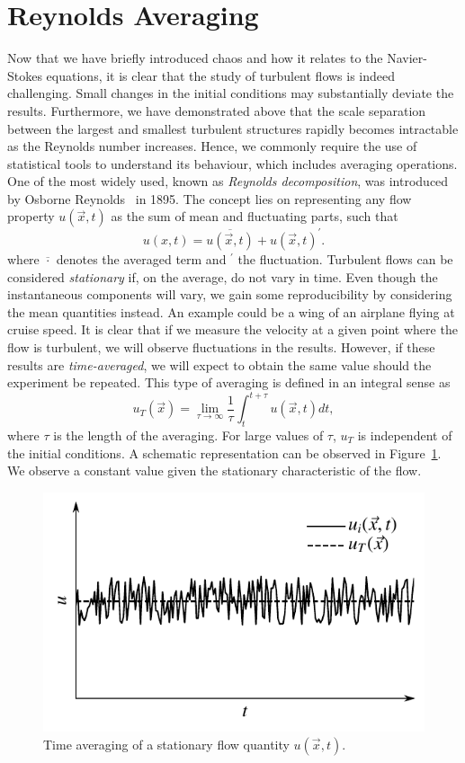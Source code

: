 \section{Reynolds Averaging}
Now that we have briefly introduced chaos and how it relates to the Navier-Stokes equations, it is clear that the study of turbulent flows is indeed challenging. Small changes in the initial conditions may substantially deviate the results. Furthermore, we have demonstrated above that the scale separation between the largest and smallest turbulent structures rapidly becomes intractable as the Reynolds number increases. Hence, we commonly require the use of statistical tools to understand its behaviour, which includes averaging operations. One of the most widely used, known as \textit{Reynolds decomposition}, was introduced by Osborne Reynolds~\cite{} in 1895. The concept lies on representing any flow property $u(\vec{x},t)$ as the sum of mean and fluctuating parts, such that
\begin{equation}
	u(x,t) = \overline{u(\vec{x},t)} + u(\vec{x},t)^\prime.
	\label{eq:reynolds_decomp}
\end{equation}
where $\overline{\cdot}$ denotes the averaged term and $^\prime$ the fluctuation.
Turbulent flows can be considered \textit{stationary} if, on the average, do not vary in time. Even though the instantaneous components will vary, we gain some reproducibility by considering the mean quantities instead. An example could be a wing of an airplane flying at cruise speed. It is clear that if we measure the velocity at a given point where the flow is turbulent, we will observe fluctuations in the results. However, if these results are \textit{time-averaged}, we will expect to obtain the same value should the experiment be repeated. This type of averaging is defined in an integral sense as
\begin{equation}
	u_T(\vec{x}) = \lim_{\tau\rightarrow\infty} \frac{1}{\tau} \int_t^{t+\tau} u(\vec{x},t)dt,
	\label{eq:time_averaging}
\end{equation}
where $\tau$ is the length of the averaging. For large values of $\tau$, $u_T$ is independent of the initial conditions. A schematic representation can be observed in Figure~\ref{fig:time_averaging}. We observe a constant value given the stationary characteristic of the flow.
\begin{figure}[htbp]
	\centering
	\includegraphics[width=0.6\linewidth]{Pictures/ch7_time_averaging}
	\caption{Time averaging of a stationary flow quantity $u(\vec{x},t).$}
	\label{fig:time_averaging}
\end{figure}

